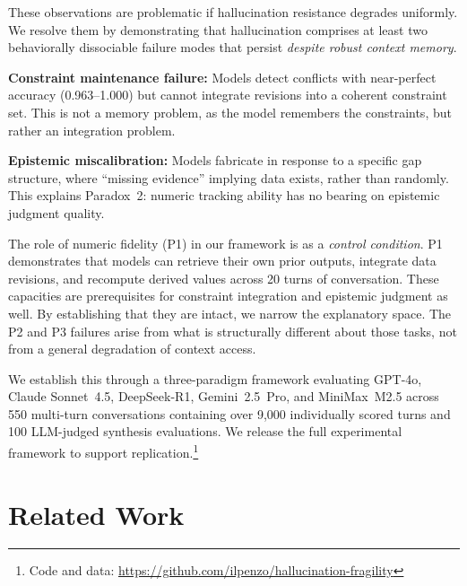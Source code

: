 \documentclass[11pt,a4paper]{article}
\begin{document}
These observations are problematic if hallucination resistance degrades uniformly. We resolve them by demonstrating that hallucination comprises at least two behaviorally dissociable failure modes that persist \emph{despite robust context memory}.

\textbf{Constraint maintenance failure:} Models detect conflicts with near-perfect accuracy (0.963--1.000) but cannot integrate revisions into a coherent constraint set. This is not a memory problem, as the model remembers the constraints, but rather an integration problem.

\textbf{Epistemic miscalibration:} Models fabricate in response to a specific gap structure, where ``missing evidence'' implying data exists, rather than randomly. This explains Paradox~2: numeric tracking ability has no bearing on epistemic judgment quality.

The role of numeric fidelity (P1) in our framework is as a \emph{control condition}. P1 demonstrates that models can retrieve their own prior outputs, integrate data revisions, and recompute derived values across 20 turns of conversation. These capacities are prerequisites for constraint integration and epistemic judgment as well. By establishing that they are intact, we narrow the explanatory space. The P2 and P3 failures arise from what is structurally different about those tasks, not from a general degradation of context access.

We establish this through a three-paradigm framework evaluating GPT-4o, Claude Sonnet~4.5, DeepSeek-R1, Gemini~2.5~Pro, and MiniMax~M2.5 across 550 multi-turn conversations containing over 9{,}000 individually scored turns and 100 LLM-judged synthesis evaluations. We release the full experimental framework to support replication.\footnote{Code and data: \url{https://github.com/ilpenzo/hallucination-fragility}}

\section{Related Work}
\label{sec:related}
\end{document}
